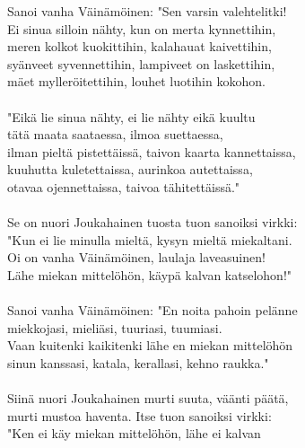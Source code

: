 Sanoi vanha Väinämöinen: "Sen varsin valehtelitki!            \\
Ei sinua silloin nähty, kun on merta kynnettihin,             \\
meren kolkot kuokittihin, kalahauat kaivettihin,              \\
syänveet syvennettihin, lampiveet on laskettihin,             \\
mäet mylleröitettihin, louhet luotihin kokohon.               \\
                                                              \\
"Eikä lie sinua nähty, ei lie nähty eikä kuultu               \\
tätä maata saataessa, ilmoa suettaessa,                       \\
ilman pieltä pistettäissä, taivon kaarta kannettaissa,        \\
kuuhutta kuletettaissa, aurinkoa autettaissa,                 \\
otavaa ojennettaissa, taivoa tähitettäissä."                  \\
                                                              \\
Se on nuori Joukahainen tuosta tuon sanoiksi virkki:          \\
"Kun ei lie minulla mieltä, kysyn mieltä miekaltani.          \\
Oi on vanha Väinämöinen, laulaja laveasuinen!                 \\
Lähe miekan mittelöhön, käypä kalvan katselohon!"             \\
                                                              \\
Sanoi vanha Väinämöinen: "En noita pahoin pelänne             \\
miekkojasi, mieliäsi, tuuriasi, tuumiasi.                     \\
Vaan kuitenki kaikitenki lähe en miekan mittelöhön            \\
sinun kanssasi, katala, kerallasi, kehno raukka."             \\
                                                              \\
Siinä nuori Joukahainen murti suuta, väänti päätä,            \\
murti mustoa haventa. Itse tuon sanoiksi virkki:              \\
"Ken ei käy miekan mittelöhön, lähe ei kalvan                 \\
